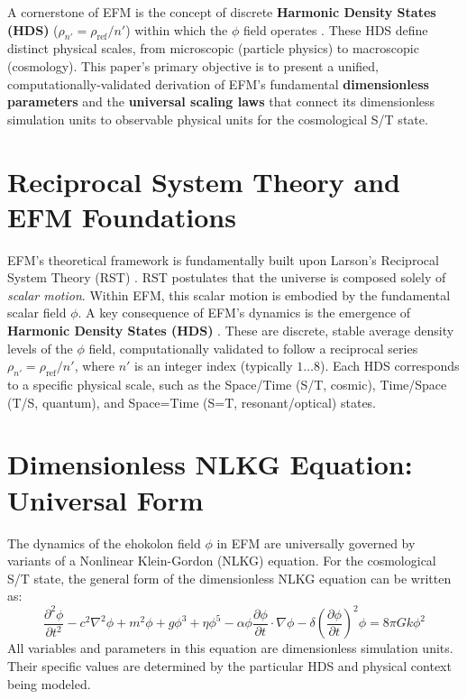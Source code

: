 \documentclass[11pt]{article}
\begin{document}
A cornerstone of EFM is the concept of discrete \textbf{Harmonic Density States (HDS)} (\(\rho_{n'} = \rho_{\text{ref}}/n'\)) within which the \(\phi\) field operates \citep{emvula2025efm_hds_validated}. These HDS define distinct physical scales, from microscopic (particle physics) to macroscopic (cosmology). This paper's primary objective is to present a unified, computationally-validated derivation of EFM's fundamental \textbf{dimensionless parameters} and the \textbf{universal scaling laws} that connect its dimensionless simulation units to observable physical units for the cosmological S/T state.

\section{Reciprocal System Theory and EFM Foundations}
EFM's theoretical framework is fundamentally built upon Larson's Reciprocal System Theory (RST) \citep{larson1959}. RST postulates that the universe is composed solely of \textit{scalar motion}. Within EFM, this scalar motion is embodied by the fundamental scalar field \(\phi\). A key consequence of EFM's dynamics is the emergence of \textbf{Harmonic Density States (HDS)} \citep{emvula2025efm_hds_validated}. These are discrete, stable average density levels of the \(\phi\) field, computationally validated to follow a reciprocal series $\rho_{n'} = \rho_{\text{ref}}/n'$, where $n'$ is an integer index (typically $1 \dots 8$). Each HDS corresponds to a specific physical scale, such as the Space/Time (S/T, cosmic), Time/Space (T/S, quantum), and Space=Time (S=T, resonant/optical) states.

\section{Dimensionless NLKG Equation: Universal Form}
The dynamics of the ehokolon field \(\phi\) in EFM are universally governed by variants of a Nonlinear Klein-Gordon (NLKG) equation. For the cosmological S/T state, the general form of the dimensionless NLKG equation can be written as:
\begin{equation}
\frac{\partial^2 \phi}{\partial t^2} - c^2 \nabla^2 \phi + m^2 \phi + g \phi^3 + \eta \phi^5 - \alpha \phi \frac{\partial \phi}{\partial t} \cdot \nabla \phi - \delta \left(\frac{\partial \phi}{\partial t}\right)^2 \phi = 8 \pi G k \phi^2
\label{eq:nlkg_universal}
\end{equation}
All variables and parameters in this equation are dimensionless simulation units. Their specific values are determined by the particular HDS and physical context being modeled.
\end{document}
